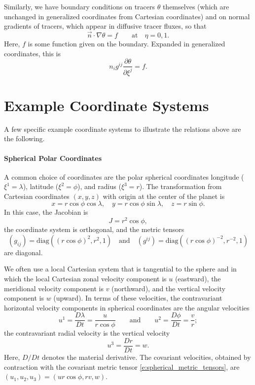 \documentclass{report}
\begin{document}
Similarly, we have boundary conditions on tracers $\theta$ themselves (which are unchanged in generalized coordinates from Cartesian coordinates) and on normal gradients of tracers, which appear in diffusive tracer fluxes, so that
\[
\vec{n} \cdot \nabla \theta = f \qquad \text{at} \quad \eta = 0, 1.
\]
Here, $f$ is some function given on the boundary. Expanded in generalized coordinates, this is 
\[
n_i g^{ij} \frac{\partial \theta}{\partial \xi^j} = f.
\]

\section{Example Coordinate Systems}\label{s:example_coordinates}

A few specific example coordinate systems to illustrate the relations above are the following.

\paragraph{Spherical Polar Coordinates} A common choice of coordinates are the polar spherical coordinates longitude ($\xi^1 = \lambda$), latitude ($\xi^2 = \phi$), and radius ($\xi^3 = r$). 
The transformation from Cartesian coordinates $(x, y, z)$ with origin at the center of the planet is
\begin{equation}
\label{e:spherical_polar_coordinates}
x = r\cos\phi\cos\lambda, \quad y = r\cos\phi\sin\lambda, \quad z = r\sin\phi.
\end{equation}
In this case, the Jacobian is
\[
J= r^2 \cos\phi,
\]
the coordinate system is orthogonal, and the metric tensors 
\begin{equation}\label{e:spherical_metric_tensors}
(g_{ij}) = \mathrm{diag}\left((r \cos\phi)^2, r^2, 1\right) 
\quad \text{and} \quad
(g^{ij}) = \mathrm{diag}\left((r \cos \phi)^{-2}, r^{-2},  1\right) 
\end{equation}
are diagonal.

We often use a local Cartesian system that is tangential to the sphere and in which the local Cartesian zonal velocity component is $u$ (eastward), the meridional velocity component is $v$ (northward), and the vertical velocity component is $w$ (upward). In terms of these velocities, the contravariant horizontal velocity components in spherical coordinates are the angular velocities 
\begin{equation}\label{e:angular_velocities}
u^1 = \frac{D\lambda}{Dt} = \frac{u}{r \cos\phi} \qquad \text{and} \qquad u^2 = \frac{D\phi}{Dt} = \frac{v}{r};
\end{equation}
the contravariant radial velocity is the vertical velocity 
\[
u^3 = \frac{Dr}{Dt} = w.
\]
Here, $D/Dt$ denotes the material derivative. The covariant velocities, obtained by contraction with the covariant metric tensor \eqref{e:spherical_metric_tensors}, are $(u_1, u_2, u_3) = (u r \cos\phi, r v, w)$.
\end{document}
